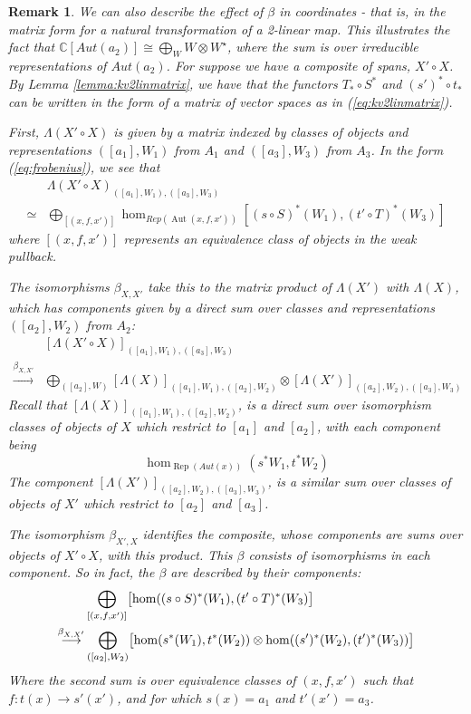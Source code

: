 \documentclass[10pt]{amsart}
\numberwithin{theorem}{subsection}
\newtheorem{varremark}[theorem]{Remark}
\newenvironment{remark}{\begin{varremark}\em}{\em\end{varremark}}
\newcommand{\ra}{\mathop{\rightarrow}}
\newcommand{\ralim}{\mathop{\ra}\limits}
\newcommand{\opname}[1]{\operatorname{#1}}
\newcommand{\FV}{\Lambda}
\begin{document}
\begin{remark}\label{rk:composbeta}
We can also describe the effect of $\beta$ in coordinates - that is, in the
matrix form for a natural transformation of a 2-linear map.  This illustrates the fact that $\mathbb{C}[Aut(a_2)] \cong \bigoplus_{W} W \otimes W^{\star}$, where the sum is over irreducible representations of $Aut(a_2)$.
For suppose
we have a composite of spans, $X' \circ X$.  By Lemma
\ref{lemma:kv2linmatrix}, we have that the functors $T_{\ast} \circ
S^{\ast}$ and $(s')^{\ast} \circ t_{\ast}$ can be written in the form
of a matrix of vector spaces as in (\ref{eq:kv2linmatrix}).

First, $\FV(X' \circ X)$ is given by a matrix indexed by classes of
objects and representations $([a_1],W_1)$ from $A_1$ and $([a_3],W_3)$
from $A_3$.  In the form (\ref{eq:frobenius}), we see that
\begin{align}
& \FV(X' \circ X)_{([a_1],W_1),([a_3],W_3)} \\
\nonumber \simeq & \bigoplus_{[(x,f,x')]} \opname{hom}_{Rep(\opname{Aut}(x,f,x'))}[(s \circ S)^{\ast}(W_1),(t' \circ T)^{\ast}(W_3)]
\end{align}
where $[(x,f,x')]$ represents an equivalence class of objects in the
weak pullback.  

The isomorphisms $\beta_{X,X'}$ take this to the matrix product of
$\FV(X')$ with $\FV(X)$, which has components given by a direct sum
over classes and representations $([a_2],W_2)$ from $A_2$:
\begin{align}\label{eq:cobmatmultcomponent}
& [\FV(X' \circ X)]_{([a_1],W_1),([a_3],W_3)} \\
\nonumber \ralim^{\beta_{X,X'}} & \bigoplus_{([a_2],W)} [\FV(X)]_{([a_1],W_1),([a_2],W_2)} \otimes [\FV(X')]_{([a_2],W_2),([a_3],W_3)}
\end{align}
Recall that $[\FV(X)]_{([a_1],W_1),([a_2],W_2)}$, is a direct sum over
isomorphism classes of objects of $X$ which restrict to $[a_1]$ and
$[a_2]$, with each component being
\begin{equation}
\hom_{\opname{Rep}(Aut(x))}(s^{\ast}W_1,t^{\ast}W_2)
\end{equation}The
component $[\FV(X')]_{([a_2],W_2),([a_3],W_3)}$, is a similar sum
over classes of objects of $X'$ which restrict to $[a_2]$ and $[a_3]$.

The isomorphism $\beta_{X',X}$ identifies the composite, whose
components are sums over objects of $X' \circ X$, with this product.
This $\beta$ consists of isomorphisms in each component.  So in fact,
the $\beta$ are described by their components:
\begin{align}
\label{eq:betaisomorphisms} & \bigoplus_{[(x,f,x')]} \bigl{[} \hom((s\circ S)^{\ast}(W_1),(t'\circ T)^{\ast}(W_3) \bigr{]} \\
\nonumber\stackrel{\beta_{X,X'}}{\longrightarrow} &  \bigoplus_{([a_2],W_2)} \bigl{[} \hom(s^{\ast}(W_1),t^{\ast}(W_2)) \otimes \hom((s')^{\ast}(W_2),(t')^{\ast}(W_3)) \bigr{]} 
\end{align}
Where the second sum is over equivalence classes of $(x,f,x')$ such
that $f : t(x) \ra s'(x')$, and for which $s(x)=a_1$ and
$t'(x')=a_3$.


\end{remark}
\end{document}

